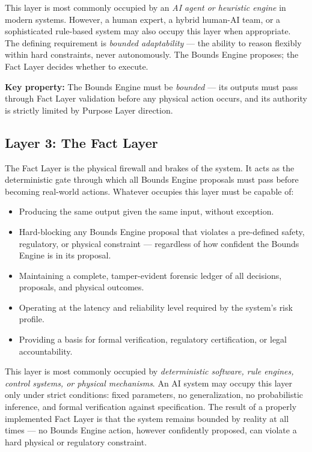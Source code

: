 \documentclass[12pt]{article}
\begin{document}
This layer is most commonly occupied by an \textit{AI agent or heuristic engine} in modern systems. However, a human expert, a hybrid human-AI team, or a sophisticated rule-based system may also occupy this layer when appropriate. The defining requirement is \textit{bounded adaptability} --- the ability to reason flexibly within hard constraints, never autonomously. The Bounds Engine proposes; the Fact Layer decides whether to execute.

\textbf{Key property:} The Bounds Engine must be \textit{bounded} --- its outputs must pass through Fact Layer validation before any physical action occurs, and its authority is strictly limited by Purpose Layer direction.

\subsection{Layer 3: The Fact Layer}

The Fact Layer is the physical firewall and brakes of the system. It acts as the deterministic gate through which all Bounds Engine proposals must pass before becoming real-world actions. Whatever occupies this layer must be capable of:

\begin{itemize}[noitemsep]
    \item Producing the same output given the same input, without exception.
    \item Hard-blocking any Bounds Engine proposal that violates a pre-defined safety, regulatory, or physical constraint --- regardless of how confident the Bounds Engine is in its proposal.
    \item Maintaining a complete, tamper-evident forensic ledger of all decisions, proposals, and physical outcomes.
    \item Operating at the latency and reliability level required by the system's risk profile.
    \item Providing a basis for formal verification, regulatory certification, or legal accountability.
\end{itemize}

This layer is most commonly occupied by \textit{deterministic software, rule engines, control systems, or physical mechanisms}. An AI system may occupy this layer only under strict conditions: fixed parameters, no generalization, no probabilistic inference, and formal verification against specification. The result of a properly implemented Fact Layer is that the system remains bounded by reality at all times --- no Bounds Engine action, however confidently proposed, can violate a hard physical or regulatory constraint.
\end{document}
